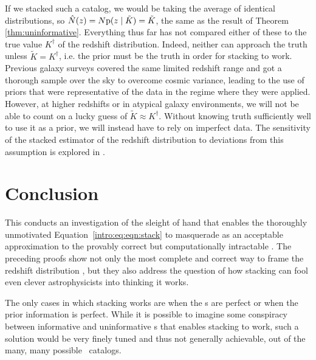 If we stacked such a catalog, we would be taking the average of identical distributions, so $\hat{N}(z) = N \mathrm{p}(z \mid \tilde{K}) = \tilde{K}$, the same as the result of Theorem \ref{thm:uninformative}.
Everything thus far has not compared either of these to the true value $K^{\dagger}$ of the redshift distribution.
Indeed, neither can approach the truth unless $\tilde{K} = K^{\dagger}$, i.e. the prior must be the truth in order for stacking to work.
Previous galaxy surveys covered the same limited redshift range and got a thorough sample over the sky to overcome cosmic variance, leading to the use of priors that were representative of the data in the regime where they were applied.
However, at higher redshifts or in atypical galaxy environments, we will not be able to count on a lucky guess of $\tilde{K} \approx K^{\dagger}$.
Without knowing truth sufficiently well to use it as a prior, we will instead have to rely on imperfect data.
The sensitivity of the stacked estimator of the redshift distribution to deviations from this assumption is explored in .

\section{Conclusion}

This \paper conducts an investigation of the sleight of hand that enables the thoroughly unmotivated Equation~\ref{intro:eq:eqn:stack} to masquerade as an acceptable approximation to the provably correct but computationally intractable .
The preceding proofs show not only the most complete and correct way to frame the redshift distribution \Nz, but they also address the question of how stacking can fool even clever astrophysicists into thinking it works.

The only cases in which stacking works are when the \pzpdf s are perfect or when the prior information is perfect.
While it is possible to imagine some conspiracy between informative and uninformative \pzpdf s that enables stacking to work, such a solution would be very finely tuned and thus not generally achievable, out of the many, many possible \pzpdf\ catalogs.

